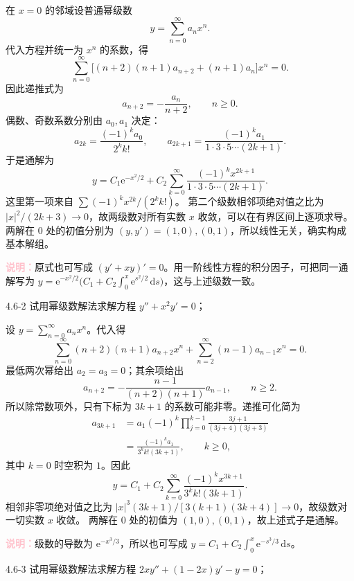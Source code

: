 \documentclass[UTF8,a4paper,11pt]{ctexart}
\newcommand{\dd}{\,\mathrm d}
\newcommand{\e}{\mathrm e}
\newcommand{\note}[1]{\par\smallskip\noindent\textcolor{pink}{\bfseries 说明：}#1\par\smallskip}
\begin{document}
\begin{solution}
在 $x=0$ 的邻域设普通幂级数
\[
y=\sum_{n=0}^{\infty}a_nx^n.
\]
代入方程并统一为 $x^n$ 的系数，得
\[
\sum_{n=0}^{\infty}
\bigl[(n+2)(n+1)a_{n+2}+(n+1)a_n\bigr]x^n=0.
\]
因此递推式为
\[
\boxed{a_{n+2}=-\frac{a_n}{n+2},\qquad n\ge0.}
\]
偶数、奇数系数分别由 $a_0,a_1$ 决定：
\[
a_{2k}=\frac{(-1)^ka_0}{2^kk!},\qquad
a_{2k+1}=\frac{(-1)^ka_1}{1\cdot3\cdot5\cdots(2k+1)}.
\]
于是通解为
\[
\boxed{y=C_1\e^{-x^2/2}
+C_2\sum_{k=0}^{\infty}\frac{(-1)^kx^{2k+1}}{1\cdot3\cdot5\cdots(2k+1)}.}
\]
这里第一项来自 $\sum(-1)^kx^{2k}/(2^kk!)$。
第二个级数相邻项绝对值之比为 $|x|^2/(2k+3)\to0$，故两级数对所有实数 $x$ 收敛，可以在有界区间上逐项求导。
两解在 $0$ 处的初值分别为 $(y,y')=(1,0),(0,1)$，所以线性无关，确实构成基本解组。
\note{原式也可写成 $(y'+xy)'=0$。用一阶线性方程的积分因子，可把同一通解写为
$y=\e^{-x^2/2}\bigl(C_1+C_2\int_0^x\e^{s^2/2}\dd s\bigr)$，这与上述级数一致。}
\end{solution}

\begin{problem}{4.6-2}
试用幂级数解法求解方程
$y''+x^2y'=0$；
\end{problem}

\begin{solution}
设 $y=\sum_{n=0}^{\infty}a_nx^n$。代入得
\[
\sum_{n=0}^{\infty}(n+2)(n+1)a_{n+2}x^n
+\sum_{n=2}^{\infty}(n-1)a_{n-1}x^n=0.
\]
最低两次幂给出 $a_2=a_3=0$；其余项给出
\[
a_{n+2}=-\frac{n-1}{(n+2)(n+1)}a_{n-1},\qquad n\ge2.
\]
所以除常数项外，只有下标为 $3k+1$ 的系数可能非零。递推可化简为
\[
\begin{aligned}
a_{3k+1}
&=a_1(-1)^k\prod_{j=0}^{k-1}
\frac{3j+1}{(3j+4)(3j+3)}\\
&=\frac{(-1)^ka_1}{3^kk!(3k+1)},\qquad k\ge0,
\end{aligned}
\]
其中 $k=0$ 时空积为 $1$。因此
\[
\boxed{y=C_1+C_2\sum_{k=0}^{\infty}
\frac{(-1)^kx^{3k+1}}{3^kk!(3k+1)}.}
\]
相邻非零项绝对值之比为
$|x|^3(3k+1)/[3(k+1)(3k+4)]\to0$，故级数对一切实数 $x$ 收敛。
两解在 $0$ 处的初值为 $(1,0),(0,1)$，故上述式子是通解。
\note{级数的导数为 $\e^{-x^3/3}$，所以也可写成
$y=C_1+C_2\int_0^x\e^{-s^3/3}\dd s$。}
\end{solution}

\begin{problem}{4.6-3}
试用幂级数解法求解方程
$2xy''+(1-2x)y'-y=0$；
\end{problem}
\end{document}

